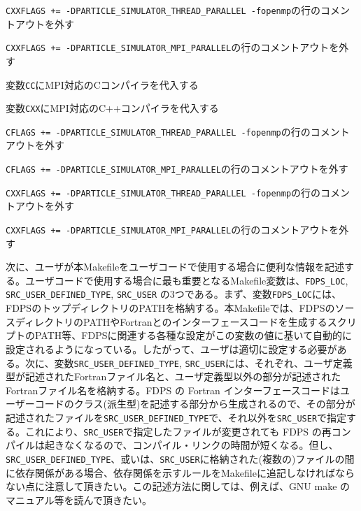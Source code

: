 \begin{itemize}
\begin{itemize}
{\item \texttt{CXXFLAGS += -DPARTICLE\_SIMULATOR\_THREAD\_PARALLEL -fopenmp}の行のコメントアウトを外す
\item \texttt{CXXFLAGS += -DPARTICLE\_SIMULATOR\_MPI\_PARALLEL}の行のコメントアウトを外す
}{%
\item 変数\texttt{CC}にMPI対応のCコンパイラを代入する
\item 変数\texttt{CXX}にMPI対応のC++コンパイラを代入する
\item \texttt{CFLAGS += -DPARTICLE\_SIMULATOR\_THREAD\_PARALLEL -fopenmp}の行のコメントアウトを外す
\item \texttt{CFLAGS += -DPARTICLE\_SIMULATOR\_MPI\_PARALLEL}の行のコメントアウトを外す
\item \texttt{CXXFLAGS += -DPARTICLE\_SIMULATOR\_THREAD\_PARALLEL -fopenmp}の行のコメントアウトを外す
\item \texttt{CXXFLAGS += -DPARTICLE\_SIMULATOR\_MPI\_PARALLEL}の行のコメントアウトを外す
}
\end{itemize}
\end{itemize}

\ifFtn %
次に、ユーザが本Makefileをユーザコードで使用する場合に便利な情報を記述する。ユーザコードで使用する場合に最も重要となるMakefile変数は、\texttt{FDPS\_LOC}, \newline \texttt{SRC\_USER\_DEFINED\_TYPE},   \texttt{SRC\_USER} の3つである。まず、変数\texttt{FDPS\_LOC}には、FDPSのトップディレクトリのPATHを格納する。本Makefileでは、FDPSのソースディレクトリのPATHやFortranとのインターフェースコードを生成するスクリプトのPATH等、FDPSに関連する各種な設定がこの変数の値に基いて自動的に設定されるようになっている。したがって、ユーザは適切に設定する必要がある。次に、変数\texttt{SRC\_USER\_DEFINED\_TYPE}, \texttt{SRC\_USER}には、それぞれ、ユーザ定義型が記述されたFortranファイル名と、ユーザ定義型以外の部分が記述されたFortranファイル名を格納する。FDPS の Fortran インターフェースコードはユーザーコードのクラス(派生型)を記述する部分から生成されるので、その部分が記述されたファイルを\texttt{SRC\_USER\_DEFINED\_TYPE}で、それ以外を\texttt{SRC\_USER}で指定する。これにより、\texttt{SRC\_USER}で指定したファイルが変更されても FDPS の再コンパイルは起きなくなるので、コンパイル・リンクの時間が短くなる。但し、\texttt{SRC\_USER\_DEFINED\_TYPE}、或いは、\texttt{SRC\_USER}に格納された(複数の)ファイルの間に依存関係がある場合、依存関係を示すルールをMakefileに追記しなければならない点に注意して頂きたい。この記述方法に関しては、例えば、GNU make のマニュアル等を読んで頂きたい。

